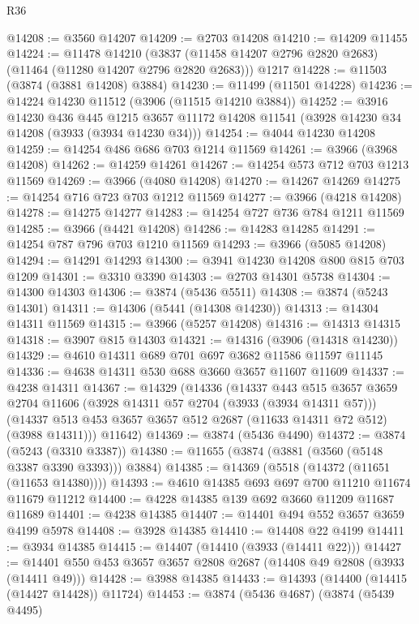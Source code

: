 \begin{lexlean}{R36}
\begin{coremodule}
@14208 := @3560 @14207
@14209 := @2703 @14208
@14210 := @14209 @11455
@14224 := @11478
    @14210
    (@3837 (@11458 @14207 @2796 @2820 @2683) (@11464 (@11280 @14207 @2796 @2820 @2683)))
    @1217
@14228 := @11503 (@3874 (@3881 @14208) @3884)
@14230 := @11499 (@11501 @14228)
@14236 := @14224 @14230 @11512 (@3906 (@11515 @14210 @3884))
@14252 := @3916
    @14230
    @436
    @445
    @1215
    @3657
    @11172
    @14208
    @11541
    (@3928 @14230 @34 @14208 (@3933 (@3934 @14230 @34)))
@14254 := @4044 @14230 @14208
@14259 := @14254 @486 @686 @703 @1214 @11569
@14261 := @3966 (@3968 @14208)
@14262 := @14259 @14261
@14267 := @14254 @573 @712 @703 @1213 @11569
@14269 := @3966 (@4080 @14208)
@14270 := @14267 @14269
@14275 := @14254 @716 @723 @703 @1212 @11569
@14277 := @3966 (@4218 @14208)
@14278 := @14275 @14277
@14283 := @14254 @727 @736 @784 @1211 @11569
@14285 := @3966 (@4421 @14208)
@14286 := @14283 @14285
@14291 := @14254 @787 @796 @703 @1210 @11569
@14293 := @3966 (@5085 @14208)
@14294 := @14291 @14293
@14300 := @3941 @14230 @14208 @800 @815 @703 @1209
@14301 := @3310 @3390
@14303 := @2703 @14301 @5738
@14304 := @14300 @14303
@14306 := @3874 (@5436 @5511)
@14308 := @3874 (@5243 @14301)
@14311 := @14306 (@5441 (@14308 @14230))
@14313 := @14304 @14311 @11569
@14315 := @3966 (@5257 @14208)
@14316 := @14313 @14315
@14318 := @3907 @815 @14303
@14321 := @14316 (@3906 (@14318 @14230))
@14329 := @4610 @14311 @689 @701 @697 @3682 @11586 @11597 @11145
@14336 := @4638 @14311 @530 @688 @3660 @3657 @11607 @11609
@14337 := @4238 @14311
@14367 := @14329
    (@14336
      (@14337
        @443
        @515
        @3657
        @3659
        @2704
        @11606
        (@3928 @14311 @57 @2704 (@3933 (@3934 @14311 @57)))
        (@14337 @513 @453 @3657 @3657 @512 @2687 (@11633 @14311 @72 @512) (@3988 @14311)))
      @11642)
@14369 := @3874 (@5436 @4490)
@14372 := @3874 (@5243 (@3310 @3387))
@14380 := @11655 (@3874 (@3881 (@3560 (@5148 @3387 @3390 @3393))) @3884)
@14385 := @14369 (@5518 (@14372 (@11651 (@11653 @14380))))
@14393 := @4610 @14385 @693 @697 @700 @11210 @11674 @11679 @11212
@14400 := @4228 @14385 @139 @692 @3660 @11209 @11687 @11689
@14401 := @4238 @14385
@14407 := @14401 @494 @552 @3657 @3659 @4199 @5978
@14408 := @3928 @14385
@14410 := @14408 @22 @4199
@14411 := @3934 @14385
@14415 := @14407 (@14410 (@3933 (@14411 @22)))
@14427 := @14401 @550 @453 @3657 @3657 @2808 @2687 (@14408 @49 @2808 (@3933 (@14411 @49)))
@14428 := @3988 @14385
@14433 := @14393 (@14400 (@14415 (@14427 @14428)) @11724)
@14453 := @3874
    (@5436 @4687)
    (@3874
      (@5439 @4495)

\end{coremodule}
\end{lexlean}
